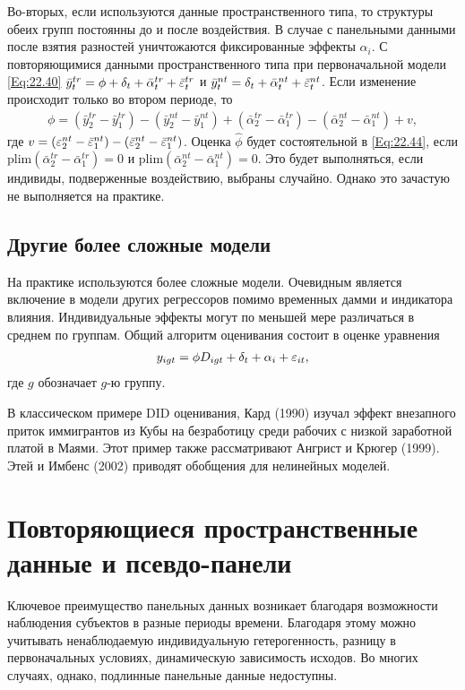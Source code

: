 Во-вторых, если используются данные пространственного типа, то структуры обеих групп постоянны до и после воздействия. В случае с панельными данными после взятия разностей уничтожаются фиксированные эффекты $\alpha_i$. С повторяющимися данными пространственного типа при первоначальной модели \ref{Eq:22.40} $\bar{y}^{tr}_t=\phi+\delta_t + \bar{\alpha}^{tr}_t+\bar{\varepsilon}^{tr}_t$ и $\bar{y}^{nt}_t=\delta_t+\bar{\alpha}^{nt}_t+\bar{\varepsilon}^{nt}_t$. Если изменение происходит только во втором периоде, то 
\begin{align}
\phi=(\bar{y}^{tr}_2- \bar{y}^{tr}_1) - ( \bar{y}^{nt}_2 - \bar{y}^{nt}_1)+ (\bar{\alpha}^{tr}_2- \bar{\alpha}^{tr}_1) - ( \bar{\alpha}^{nt}_2 - \bar{\alpha}^{nt}_1) + v,
\nonumber
\end{align}
где $v=(\varepsilon^{nt}_2 - \bar{\varepsilon}^{nt}_1)-(\bar{\varepsilon}^{nt}_2-\bar{\varepsilon}^{nt}_1)$. Оценка $\hat{\phi}$ будет состоятельной в \ref{Eq:22.44}, если $\mathrm{plim} (\bar{\alpha}^{tr}_2-\bar{\alpha}^{tr}_1)=0$ и $\mathrm{plim} (\bar{\alpha}^{nt}_2-\bar{\alpha}^{nt}_1)=0$. Это будет выполняться, если индивиды, подверженные воздействию, выбраны случайно. Однако это зачастую не выполняется на практике.


\subsection{Другие более сложные модели}

На практике используются более сложные модели. Очевидным является включение в модели других регрессоров помимо временных дамми и индикатора влияния. Индивидуальные эффекты могут по меньшей мере различаться в среднем по группам. Общий алгоритм оценивания состоит в оценке уравнения
\begin{align}
y_{igt}=\phi D_{igt} + \delta_t + \alpha_i + \varepsilon_{it},
\nonumber
\end{align}
где $g$ обозначает  $g$-ю группу.

В классическом примере DID оценивания, Кард (1990) изучал эффект внезапного приток иммигрантов из Кубы на безработицу среди рабочих с низкой заработной платой в Маями. Этот пример также рассматривают Ангрист и Крюгер (1999). Этей и Имбенс (2002) приводят обобщения для нелинейных моделей.

\section{Повторяющиеся пространственные данные и псевдо-панели}

Ключевое преимущество панельных данных возникает благодаря возможности наблюдения субъектов в разные периоды времени. Благодаря этому можно  учитывать ненаблюдаемую индивидуальную гетерогенность, разницу в первоначальных условиях, динамическую зависимость исходов. Во многих случаях, однако, подлинные панельные данные недоступны.

